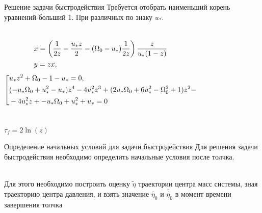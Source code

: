 \documentclass[10pt]{beamer}
\begin{document}
\begin{frame}{Решение задачи быстродействия}
	Требуется отобрать наименьший корень уравнений больший 1. При различных по знаку $u_*$.

	\begin{columns}
		\begin{equation}\label{x-y}
			{\begin{aligned}
					 & x=\left( \frac{1}{2z}-\frac{u_*z}{2}-(\Omega_0-u_*)\frac{1}{2z}\right)\frac{z}{u_*(1-z)} \hfill \\
					 & y=zx, \hfill                                                                                    \\
				\end{aligned}}
		\end{equation}
		\begin{equation}\label{koshisystem}
			\left[ {\begin{aligned}
						 & u_*z^2+\Omega _0-1-u_*=0, \hfill                                                            \\
						 & (-u_* \Omega _0+u_*^2-u_*)z^4-4 u_*^2z^3+(2 u_* \Omega _0+6 u_*^2-\Omega _0^2+1)z^2- \hfill \\
						 & -4 u_*^2z+-u_* \Omega _0+u_*^2+u_*=0                                                        \\
					\end{aligned}} \right.
		\end{equation}
	\end{columns}
	$\tau_f=2\ln(z)$

\end{frame}

\begin{frame}{Определение начальных условий для задачи быстродействия}
	Для решения задачи быстродействия необходимо определить начальные условия после толчка.

	\hfill \\
	Для этого необходимо построить оценку $\tilde{\eta}$ траектории центра масс системы, зная траекторию центра давления,
	и взять значение $\tilde{\eta_0}$ и $\tilde{\dot{\eta_0}}$ в момент времени завершения толчка

\end{frame}
\end{document}
